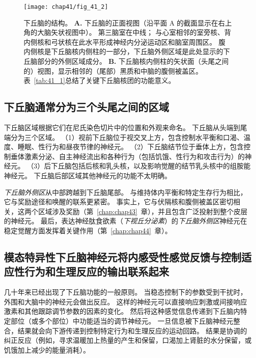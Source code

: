 \begin{figure}[htbp]
	\centering
	\texttt{[image: chap41/fig\_41\_2]}
	\caption{下丘脑的结构。
		\textbf{A.} 下丘脑的正面视图（沿平面 A 的截面显示在右上角的大脑矢状视图中）。
		第三脑室在中线；
		与心室相邻的室旁核、背内侧核和弓状核在此水平形成神经内分泌运动区和脑室周围区。
		腹内侧核是下丘脑核内侧柱的一部分，下丘脑外侧区域是此处显示的下丘脑部分的外侧区域成分。 
		\textbf{B.} 下丘脑核内侧柱的矢状面（头尾之间的）视图，显示相邻的（尾部）黑质和中脑的腹侧被盖区。
		表~\ref{tab:41_1}总结了关键下丘脑核团的功能意义。}
	\label{fig:41_2}
\end{figure}



\subsection{下丘脑通常分为三个头尾之间的区域}

下丘脑区域根据它们在尼氏染色切片中的位置和外观来命名。
下丘脑从头端到尾端分为三个区域。
（1）视前下丘脑位于视交叉上方，包含控制水平衡和口渴、温度、睡眠、性行为和昼夜节律的神经元。
（2）下丘脑结节位于垂体上方，包含控制垂体激素分泌、自主神经流出和各种行为（包括饥饿、性行为和攻击行为）的神经元。
（3）后下丘脑包括后核和乳头核，以及影响觉醒的结节乳头核中的组胺能神经元。
下丘脑后部区域其他神经元的功能不太明确。


\textit{下丘脑外侧区}从中部跨越到下丘脑尾部。
与维持体内平衡和特定生存行为相比，它与奖励途径和唤醒的联系更紧密。
事实上，它与伏隔核和腹侧被盖区密切相关，这两个区域涉及奖励（第~\ref{chap:chap43}~章），并且包含广泛投射到整个皮层的神经元。
最后，表达神经肽食欲素（\textit{下视丘分泌素}）的\textit{下丘脑外侧区}神经元在稳定觉醒方面发挥着关键作用（第~\ref{chap:chap44}~章）。



\subsection{模态特异性下丘脑神经元将内感受性感觉反馈与控制适应性行为和生理反应的输出联系起来}

几十年来已经出现了下丘脑功能的一般原则。
当稳态控制下的参数受到干扰时，外围和大脑中的神经元会做出反应。
这样的神经元可以直接响应刺激或间接响应激素和其他跟踪调节参数的因素的变化。
然后将这种感觉信息传递到下丘脑内特定部位（或多个部位）中功能适当的调节神经元。
一旦信息被下丘脑神经元整合，结果就会向下游传递到控制特定行为和生理反应的运动回路。
结果是协调的纠正反应（例如，寻求温暖加上热量的产生和保留，口渴加上肾脏的水分保留，或饥饿加上减少的能量消耗）。


